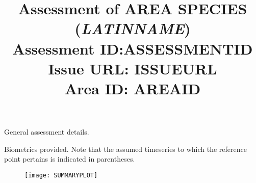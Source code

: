 \documentclass[a4paper,10pt]{article}
\title{Assessment of AREA SPECIES (\textit{LATINNAME})\\{\large Assessment ID:ASSESSMENTID \\Issue URL: ISSUEURL \\Area ID: AREAID}}
\date{}
\begin{document}
\maketitle
\thispagestyle{empty}
\vspace*{-.75in}
\begin{center}
{\large General assessment details.}
\end{center}

\begin{center}
{\large Biometrics provided. Note that the assumed timeseries to which the reference point pertains is indicated in parentheses.}
\begin{table}[htb]
\centering



\end{table}
\end{center}
%
\pagebreak
\vspace*{1cm}

\begin{figure}[htbp] %
   \centering
   \texttt{[image: SUMMARYPLOT]} 
\end{figure}
\end{document}
